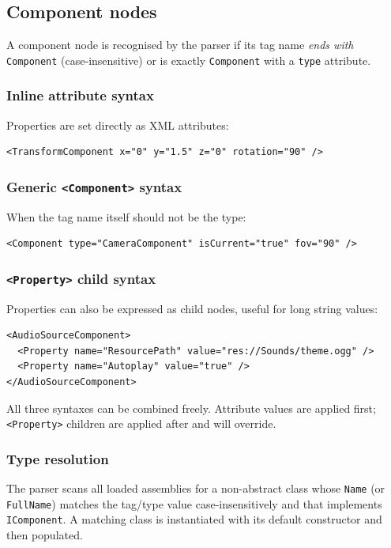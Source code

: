 \documentclass[11pt,a4paper]{article}
\begin{document}
\subsection{Component nodes}

A component node is recognised by the parser if its tag name \emph{ends with}
\texttt{Component} (case-insensitive) or is exactly \texttt{Component} with a
\texttt{type} attribute.

\subsubsection{Inline attribute syntax}
Properties are set directly as XML attributes:
\begin{lstlisting}
<TransformComponent x="0" y="1.5" z="0" rotation="90" />
\end{lstlisting}

\subsubsection{Generic \texttt{<Component>} syntax}
When the tag name itself should not be the type:
\begin{lstlisting}
<Component type="CameraComponent" isCurrent="true" fov="90" />
\end{lstlisting}

\subsubsection{\texttt{<Property>} child syntax}
Properties can also be expressed as child nodes, useful for long string values:
\begin{lstlisting}
<AudioSourceComponent>
  <Property name="ResourcePath" value="res://Sounds/theme.ogg" />
  <Property name="Autoplay" value="true" />
</AudioSourceComponent>
\end{lstlisting}

\begin{notebox}
  All three syntaxes can be combined freely.  Attribute values are applied
  first; \texttt{<Property>} children are applied after and will override.
\end{notebox}

\subsubsection{Type resolution}

The parser scans all loaded assemblies for a non-abstract class whose
\texttt{Name} (or \texttt{FullName}) matches the tag/type value
case-insensitively and that implements \texttt{IComponent}.  A matching class
is instantiated with its default constructor and then populated.
\end{document}
